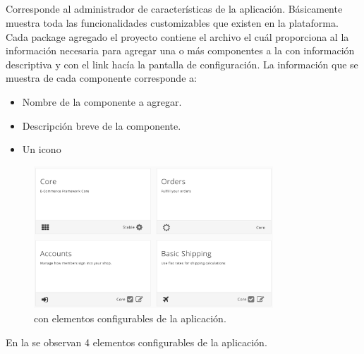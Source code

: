 \subsection{\dashboardEF}
Corresponde al administrador de características de la aplicación. Básicamente muestra toda las funcionalidades customizables que existen en la plataforma.
Cada package agregado el proyecto contiene el archivo \packageDescriptionFILE el cuál proporciona al \dashboardEF la información necesaria para agregar una o más componentes a la \uiSiglaAS con información descriptiva y con el link hacía la pantalla de configuración.
La información que se muestra de cada componente corresponde a:

\begin{itemize}
	\item Nombre de la componente a agregar.
	\item Descripción breve de la componente.
	\item Un icono 
\end{itemize} 


\begin{figure}[H]
	\centering
	\includegraphics[width=0.8\textwidth]{figuras/dashboard/dashboard_menu.png}
	\caption{\dashboardEF con elementos configurables de la aplicación.}
	\label{figure:dashboard:dashboard_menu}
\end{figure}

En la  se observan 4 elementos configurables de la aplicación. 

\subsubsection{\ecomFrameworkCoreEF}

